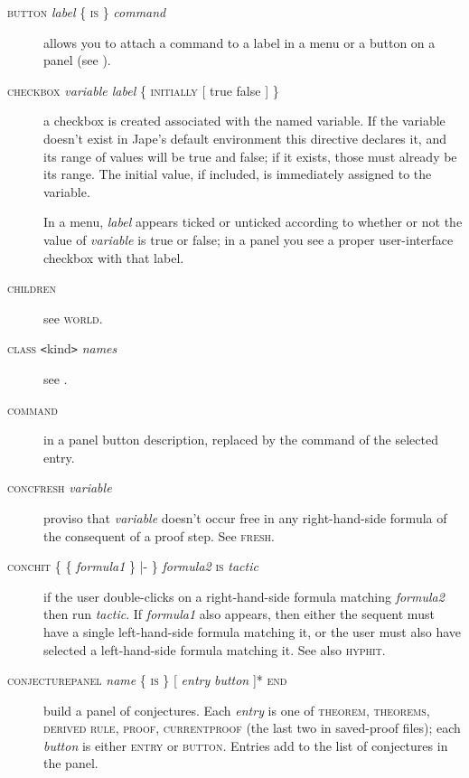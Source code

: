 \begin{description}
\item[\textsc{button} \textit{label} \{ \textsc{is} \} \textit{command}] allows you to attach a command to a label in a menu or a button on a panel (see ).

\item[\textsc{checkbox} \textit{variable label} \{ \textsc{initially [} true {\textbar} false \textsc{]} \}] a checkbox is created associated with the named variable. If the variable doesn't exist in Jape's default environment this directive declares it, and its range of values will be true and false; if it exists, those must already be its range. The initial value, if included, is immediately assigned to the variable.

In a menu, \textit{label} appears ticked or unticked according to whether or not the value of \textit{variable} is true or false; in a panel you see a proper user-interface checkbox with that label.

\item[\textsc{children}] see \textsc{world}. 

\item[\textsc{class}  \texttt{<}kind\texttt{>} \textit{names}] see .

\item[\textsc{command}] in a panel button description, replaced by the command of the selected entry.

\item[\textsc{concfresh} \textit{variable}] proviso that \textit{variable} doesn't occur free in any right-hand-side formula of the consequent of a proof step. See \textsc{fresh}.

\item[\textsc{conchit} \{ \{ \textit{formula1} \} |- \} \textit{formula2} \textsc{is} \textit{tactic}] if the user double-clicks on a right-hand-side formula matching \textit{formula2} then run \textit{tactic}. If \textit{formula1} also appears, then either the sequent must have a single left-hand-side formula matching it, or the user must also have selected a left-hand-side formula matching it. See also \textsc{hyphit}.

\item[\textsc{conjecturepanel} \textit{name} \{ \textsc{is} \} {[} \textit{entry} {\textbar} \textit{button} {]}* \textsc{end}] build a panel of conjectures. Each \textit{entry} is one of \textsc{theorem, theorems, derived rule, proof, currentproof} (the last two in saved-proof files); each \textit{button} is either \textsc{entry} or \textsc{button}. Entries add to the list of conjectures in the panel. 


\end{description}
